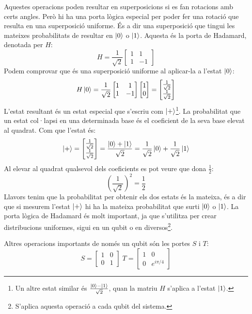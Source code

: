 Aquestes operacions poden resultar en superposicions si es fan rotacions amb certs angles. Però hi ha una porta lògica especial per poder fer una rotació que resulta en una superposició uniforme. És a dir una superposició que tingui les mateixes probabilitats de resultar en $\ket{0}$ o $\ket{1}$. Aquesta és la porta de Hadamard, denotada per $H$:
\begin{equation}
	H = \frac{1}{\sqrt{2}}\begin{bmatrix}
		1 & 1 \\ 1 & -1
	\end{bmatrix}
\end{equation}
Podem comprovar que és una superposició uniforme al aplicar-la a l'estat $\ket{0}$:
$$
H\ket{0} = \frac{1}{\sqrt{2}}\begin{bmatrix}1 & 1 \\ 1 & -1 \end{bmatrix}\begin{bmatrix}1 \\ 0\end{bmatrix} = \begin{bmatrix} \frac{1}{\sqrt{2}} \\ \frac{1}{\sqrt{2}} \end{bmatrix}
$$
L'estat resultant és un estat especial que s'escriu com $\ket{+}$\footnote{Un altre estat similar és $\frac{\ket{0} - \ket{1}}{\sqrt{2}}$, quan la matriu $H$ s'aplica a l'estat $\ket{1}$.}. La probabilitat que un estat col·lapsi en una determinada base és el coeficient de la seva base elevat al quadrat. Com que l'estat és:
$$
\ket{+} = \begin{bmatrix} \frac{1}{\sqrt{2}} \\ \frac{1}{\sqrt{2}} \end{bmatrix} = \frac{\ket{0} + \ket{1}}{\sqrt{2}} =  \frac{1}{\sqrt{2}}\ket{0} +  \frac{1}{\sqrt{2}}\ket{1}
$$
Al elevar al quadrat qualsevol dels coeficients es pot veure que dona $\frac{1}{2}$:
$$
\left(\frac{1}{\sqrt{2}}\right)^2 = \frac{1}{2}
$$
Llavors tenim que la probabilitat per obtenir els dos estats és la mateixa, és a dir que si mesurem l'estat $\ket{+}$ hi ha la mateixa probabilitat que surti $\ket{0}$ o $\ket{1}$. La porta lògica de Hadamard és molt important, ja que s'utilitza per crear distribucions uniformes, sigui en un qubit o en diversos\footnote{S'aplica aquesta operació a cada qubit del sistema.}.

Altres operacions importants de només un qubit són les portes $S$ i $T$:
$$
S=\begin{bmatrix} 1 & 0 \\ 0 & 1 \end{bmatrix} \; T=\begin{bmatrix} 1 & 0 \\ 0 & e^{i\pi/4} \end{bmatrix}
$$


